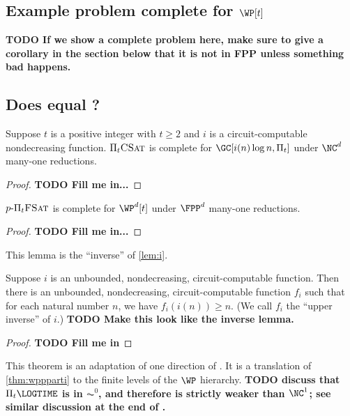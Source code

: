 \documentclass{article}
\newcommand{\todo}[1]{\textbf{TODO #1}}
\newcommand{\dash}{\textnormal{-}}
\newcommand{\pPiFSAT}{p \dash \Pi_t \textsc{FSat}}
\newcommand{\PiCSAT}{\Pi_t \textsc{CSat}}
\begin{document}
\subsection{Example problem complete for \texorpdfstring{$\WP[t]$}{WP[t]}}

\todo{If we show a complete problem here, make sure to give a corollary in the section below that it is not in FPP unless something bad happens.}

\subsection{Does \texorpdfstring{\FPP}{FPP} equal \texorpdfstring{\WP[t]}{WP[t]}?}

\begin{theorem}\label{thm:picsatgc}
  Suppose $t$ is a positive integer with $t \geq 2$ and $i$ is a circuit-computable nondecreasing function.
  $\PiCSAT$ is complete for $\GC[i(n) \log n, \Pi_t]$ under $\NC^d$ many-one reductions.
\end{theorem}
\begin{proof}
  \todo{Fill me in...}
\end{proof}

\begin{theorem}\label{thm:ppifsat}
  $\pPiFSAT$ is complete for $\WP^d[t]$ under $\FPP^d$ many-one reductions.
\end{theorem}
\begin{proof}
  \todo{Fill me in...}
\end{proof}

This lemma is the ``inverse'' of \autoref{lem:i}.

\begin{lemma}\label{lem:upperinverse}
  Suppose $i$ is an unbounded, nondecreasing, circuit-computable function.
  Then there is an unbounded, nondecreasing, circuit-computable function $f_i$ such that for each natural number $n$, we have $f_i(i(n)) \geq n$.
  (We call $f_i$ the ``upper inverse'' of $i$.)
  \todo{Make this look like the inverse lemma.}
\end{lemma}
\begin{proof}
  \todo{Fill me in}
\end{proof}

This theorem is an adaptation of one direction of \autocite[Theorem~4.3]{cc97npo}.
It is a translation of \autoref{thm:wppparti} to the finite levels of the $\WP$ hierarchy.
\todo{discuss that $\Pi_t \LOGTIME$ is in $\AC^0$, and therefore is strictly weaker than $\NC^1$; see similar discussion at the end of \autocite{cc97npo}.}
\end{document}
